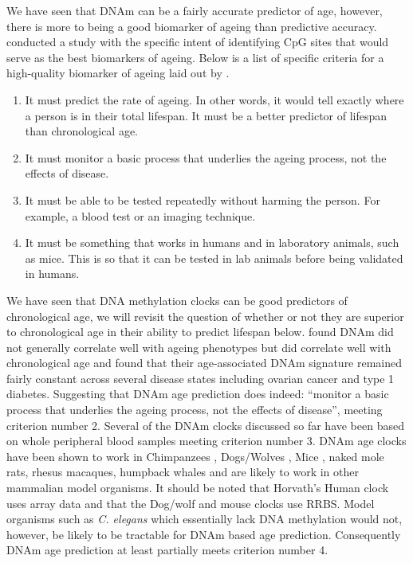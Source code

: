 \documentclass[
]{book}
\providecommand{\tightlist}{%
  \setlength{\itemsep}{0pt}\setlength{\parskip}{0pt}}
\begin{document}
We have seen that DNAm can be a fairly accurate predictor of age, however, there is more to being a good biomarker of ageing than predictive accuracy. \citet{Weidner2014} conducted a study with the specific intent of identifying CpG sites that would serve as the best biomarkers of ageing. Below is a list of specific criteria for a high-quality biomarker of ageing laid out by \citet{Johnson2006}.

\begin{enumerate}
\def\labelenumi{\arabic{enumi}.}
\tightlist
\item
  It must predict the rate of ageing. In other words, it would tell exactly where a person is in their total lifespan. It must be a better predictor of lifespan than chronological age.
\item
  It must monitor a basic process that underlies the ageing process, not the effects of disease.
\item
  It must be able to be tested repeatedly without harming the person. For example, a blood test or an imaging technique.
\item
  It must be something that works in humans and in laboratory animals, such as mice. This is so that it can be tested in lab animals before being validated in humans.
\end{enumerate}

We have seen that DNA methylation clocks can be good predictors of chronological age, we will revisit the question of whether or not they are superior to chronological age in their ability to predict lifespan below. \citet{Bell2012} found DNAm did not generally correlate well with ageing phenotypes but did correlate well with chronological age and \citet{Teschendorff2010} found that their age-associated DNAm signature remained fairly constant across several disease states including ovarian cancer and type 1 diabetes. Suggesting that DNAm age prediction does indeed: ``monitor a basic process that underlies the ageing process, not the effects of disease'', meeting criterion number 2. Several of the DNAm clocks discussed so far have been based on whole peripheral blood samples meeting criterion number 3. DNAm age clocks have been shown to work in Chimpanzees \citep{Horvath2013}, Dogs/Wolves \citep{Thompson2017}, Mice \citep{Stubbs2017}, naked mole rats, rhesus macaques, humpback whales \citep{Lowe2018} and are likely to work in other mammalian model organisms. It should be noted that Horvath's Human clock uses array data and that the Dog/wolf and mouse clocks use RRBS. Model organisms such as \emph{C. elegans} which essentially lack DNA methylation would not, however, be likely to be tractable for DNAm based age prediction. Consequently DNAm age prediction at least partially meets criterion number 4.
\end{document}
